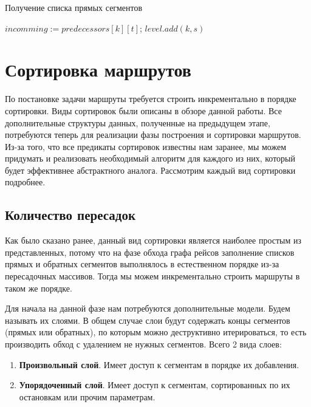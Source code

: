 \begin{algorithm}[!h]
	\caption{Получение списка прямых сегментов}\label{lst5}
	\begin{algorithmic}
		\State $incomming := predecessors[k][t]$;
		\State $level.add(k, s)$
		\EndFor
		\EndFor
		\EndFunction
	\end{algorithmic}
\end{algorithm}

\section{Сортировка маршрутов}
По постановке задачи маршруты требуется строить инкрементально в порядке сортировки. Виды сортировок были описаны в обзоре данной работы. Все дополнительные структуры данных, полученные на предыдущем этапе, потребуются теперь для реализации фазы построения и сортировки маршрутов. Из-за того, что все предикаты сортировок известны нам заранее, мы можем придумать и реализовать необходимый алгоритм для каждого из них, который будет эффективнее абстрактного аналога. Рассмотрим каждый вид сортировки подробнее.

\subsection{Количество пересадок}
Как было сказано ранее, данный вид сортировки является наиболее простым из представленных, потому что на фазе обхода графа рейсов заполнение списков прямых и обратных сегментов выполнялось в естественном порядке из-за пересадочных массивов. Тогда мы можем инкрементально строить маршруты в таком же порядке.

Для начала на данной фазе нам потребуются дополнительные модели. Будем называть их слоями. В общем случае слои будут содержать концы сегментов (прямых или обратных), по которым можно деструктивно итерироваться, то есть производить обход с удалением не нужных сегментов. Всего 2 вида слоев:
\begin{enumerate}
	\item \textbf{Произвольный слой}. Имеет доступ к сегментам в порядке их добавления.
	\item \textbf{Упорядоченный слой}. Имеет доступ к сегментам, сортированных по их остановкам или прочим параметрам.
\end{enumerate}

